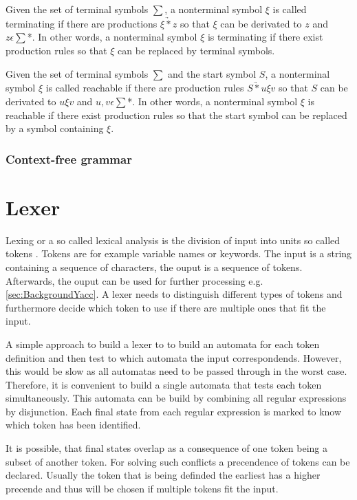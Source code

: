 Given the set of terminal symbols $\sum$, a nonterminal symbol $\xi$ is called terminating if there are productions $\xi \underrightarrow{*} z$ so that $\xi$ can be derivated to $z$ and $z \epsilon \sum$*. 
In other words, a nonterminal symbol $\xi$ is terminating if there exist production rules so that  $\xi$ can be replaced by terminal symbols. \cite{Cremers75}

Given the set of terminal symbols $\sum$ and the start symbol $S$, a nonterminal symbol $\xi$ is called reachable if there are production rules $S \underrightarrow{*} u\xi v$ so that $S$ can be derivated to $u\xi v$ and $u,v \epsilon \sum$*. 
In other words, a nonterminal symbol $\xi$ is reachable if there exist production rules so that the start symbol can be replaced by a symbol containing $\xi$. \cite{Cremers75}

\subsubsection{Context-free grammar}


\section{Lexer}\label{sec:BackgroundLexer}
Lexing or a so called lexical analysis is the division of input into units so called tokens \cite{LexYacc.1992}. Tokens are for example variable names or keywords.
The input is a string containing a sequence of characters, the ouput is a sequence of tokens. 
Afterwards, the ouput can be used for further processing e.g. \ref{sec:BackgroundYacc}.
A lexer needs to distinguish different types of tokens and furthermore decide which token to use if there are multiple ones that fit the input. \cite{Mogensen.2017}

A simple approach to build a lexer to to build an automata for each token definition and then test to which automata the input correspondends.
However, this would be slow as all automatas need to be passed through in the worst case.
Therefore, it is convenient to build a single automata that tests each token simultaneously.
This automata can be build by combining all regular expressions by disjunction.
Each final state from each regular expression is marked to know which token has been identified.

It is possible, that final states overlap as a consequence of one token being a subset of another token.
For solving such conflicts a precendence of tokens can be declared. Usually the token that is being definded the earliest has a higher precende and thus will be chosen if multiple tokens fit the input. \cite{Mogensen.2017}


